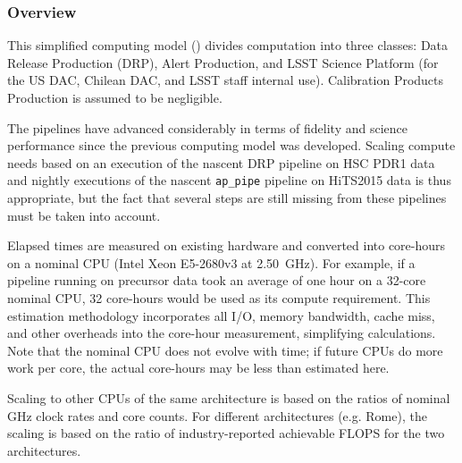 

\subsubsection{Overview}
This simplified computing model () divides computation into three classes: Data Release Production (DRP), Alert Production, and LSST Science Platform (for the US DAC, Chilean DAC, and LSST staff internal use).
Calibration Products Production is assumed to be negligible.

The pipelines have advanced considerably in terms of fidelity and science performance since the previous computing model  was developed.
Scaling compute needs based on an execution of the nascent DRP pipeline on HSC PDR1 data and nightly executions of the nascent \texttt{ap\_pipe} pipeline on HiTS2015 data is thus appropriate, but the fact that several steps are still missing from these pipelines must be taken into account.

Elapsed times are measured on existing hardware and converted into core-hours on a nominal CPU (Intel Xeon E5-2680v3 at 2.50~GHz).
For example, if a pipeline running on precursor data took an average of one hour on a 32-core nominal CPU, 32 core-hours would be used as its compute requirement.
This estimation methodology incorporates all I/O, memory bandwidth, cache miss, and other overheads into the core-hour measurement, simplifying calculations.
Note that the nominal CPU does not evolve with time; if future CPUs do more work per core, the actual core-hours may be less than estimated here.

Scaling to other CPUs of the same architecture is based on the ratios of nominal GHz clock rates and core counts.
For different architectures (e.g. Rome), the scaling is based on the ratio of industry-reported achievable FLOPS for the two architectures.

